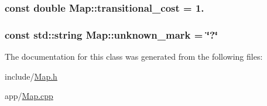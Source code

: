 \subsubsection[{\texorpdfstring{transitional\+\_\+cost}{transitional_cost}}]{\setlength{\rightskip}{0pt plus 5cm}const double Map\+::transitional\+\_\+cost = 1.}\hypertarget{classMap_ac42d63e94fc2df264c2f280451f9003e}{}\label{classMap_ac42d63e94fc2df264c2f280451f9003e}
\subsubsection[{\texorpdfstring{unknown\+\_\+mark}{unknown_mark}}]{\setlength{\rightskip}{0pt plus 5cm}const std\+::string Map\+::unknown\+\_\+mark = \char`\"{}?\char`\"{}}\hypertarget{classMap_a4b9db3b7db8399a2689cbfa6ec179c47}{}\label{classMap_a4b9db3b7db8399a2689cbfa6ec179c47}


The documentation for this class was generated from the following files\+:\begin{DoxyCompactItemize}
\item 
include/\hyperlink{Map_8h}{Map.\+h}\item 
app/\hyperlink{Map_8cpp}{Map.\+cpp}\end{DoxyCompactItemize}
